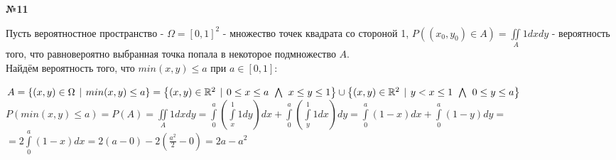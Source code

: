 \documentclass{article}
\newenvironment{task}{\begin{center}\fontsize{14}{14}\selectfont\bf}{\rm\fontsize{12}{12}\selectfont\end{center}}
\begin{document}
	\begin{task} 
		№11
	\end{task}
	Пусть вероятностное пространство - $\Omega = [0, 1]^2$ - множество точек квадрата со стороной 1, $P((x_0, y_0) \in A) = \iint\limits_{A}1dxdy$ - вероятность того, что равновероятно выбранная точка попала в некоторое подмножество $A$. \\
	Найдём вероятность того, что $min(x, y) \leq a$ при $a \in [0, 1]$:
	\begin{center}
		$A = \left\lbrace(x, y) \in \Omega \hspace{4px}|\hspace{4px} min(x, y) \leq a \right\rbrace
		= \left\lbrace(x, y) \in \mathbb{R}^2 \hspace{4px}|\hspace{4px} 0\leq x \leq a \hspace{4px}\bigwedge\hspace{4px} x \leq y \leq 1 \right\rbrace 
		\cup 
		\left\lbrace(x, y) \in \mathbb{R}^2 \hspace{4px}|\hspace{4px} y < x \leq 1 \hspace{4px}\bigwedge\hspace{4px} 0 \leq y \leq a \right\rbrace $ \\
		
		$P(min(x, y) \leq a) = P(A) = \iint\limits_A1dxdy 
		= \int\limits_0^a \left( \int\limits_x^1 1dy \right)dx  + \int\limits_0^a \left( \int\limits_y^1 1dx \right)dy 
		= \int\limits_0^a \left( 1 - x \right)dx  + \int\limits_0^a \left( 1-y \right)dy 
		= $\\$= 2 \int\limits_0^a \left( 1 - x \right)dx = 2(a - 0) - 2(\frac{a^2}{2} - 0) 
		= 2a - a^2$\\
	\end{center}
	
\end{document}
